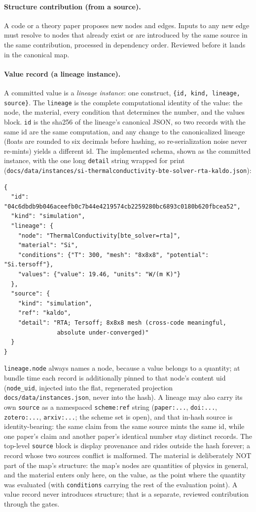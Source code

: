 \documentclass[11pt,a4paper]{article}
\begin{document}
\paragraph{Structure contribution (from a source).} A code or a theory paper proposes
new nodes and edges. Inputs to any new edge must resolve to nodes that already
exist or are introduced by the same source in the same contribution, processed
in dependency order. Reviewed before it lands in the canonical map.

\paragraph{Value record (a lineage instance).} A committed value is a
\emph{lineage instance}: one construct, \texttt{\{id, kind, lineage, source\}}.
The \texttt{lineage} is the complete computational identity of the value: the
node, the material, every condition that determines the number, and the values
block. \texttt{id} is the sha256 of the lineage's canonical JSON, so two
records with the same id are the same computation, and any change to the
canonicalized lineage (floats are rounded to six decimals before hashing, so
re-serialization noise never re-mints) yields a different id. The implemented schema, shown as the committed
instance, with the one long \texttt{detail} string wrapped for print
(\texttt{docs/data/instances/si-thermalconductivity-bte-solver-rta-kaldo.json}):

{\small
\begin{verbatim}
{
  "id": "04c6dbdb9b046aceefb0c7b44e4219574cb2259280bc6893c0180b620fbcea52",
  "kind": "simulation",
  "lineage": {
    "node": "ThermalConductivity[bte_solver=rta]",
    "material": "Si",
    "conditions": {"T": 300, "mesh": "8x8x8", "potential": "Si.tersoff"},
    "values": {"value": 19.46, "units": "W/(m K)"}
  },
  "source": {
    "kind": "simulation",
    "ref": "kaldo",
    "detail": "RTA; Tersoff; 8x8x8 mesh (cross-code meaningful,
               absolute under-converged)"
  }
}
\end{verbatim}
}

\texttt{lineage.node} always names a node, because a value belongs to a
quantity; at bundle time each record is additionally pinned to that node's
content uid (\texttt{node\_uid}, injected into the flat, regenerated projection
\texttt{docs/data/instances.json}, never into the hash). A lineage may also
carry its own \texttt{source} as a namespaced \texttt{scheme:ref} string
(\texttt{paper:...}, \texttt{doi:...}, \texttt{zotero:...},
\texttt{arxiv:...}; the scheme set is open), and that in-hash source is
identity-bearing: the same claim from the same source mints the same id, while
one paper's claim and another paper's identical number stay distinct records.
The top-level \texttt{source} block is display provenance and rides outside
the hash forever; a record whose two sources conflict is malformed. The
material is deliberately NOT part of the map's
structure: the map's nodes are quantities of physics in general, and the
material enters only here, on the value, as the point where the quantity was
evaluated (with \texttt{conditions} carrying the rest of the evaluation
point). A value record never introduces structure; that is a separate,
reviewed contribution through the gates.
\end{document}
